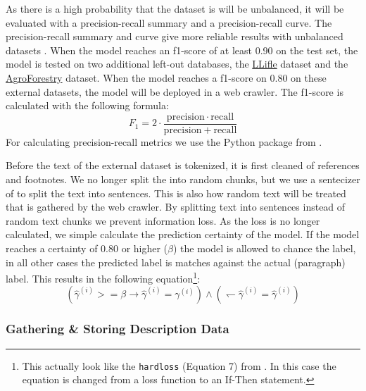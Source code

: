 \documentclass[a4paper, 12pt, oneside]{book} %
\begin{document}
As there is a high probability that the dataset is will be unbalanced, it will be evaluated with a precision-recall summary and a precision-recall curve.
The precision-recall summary and curve give more reliable results with unbalanced datasets \autocite{saito_precision-recall_2015}.
When the model reaches an f1-score of at least 0.90 on the test set, the model is tested on two additional left-out databases, the \href{http://www.llifle.com/}{LLifle} dataset and the \href{https://www.worldagroforestry.org/}{AgroForestry} dataset.
When the model reaches a f1-score on 0.80 on these external datasets, the model will be deployed in a web crawler.
The f1-score is calculated with the following formula:
\begin{equation}
    F_1 = 2 \cdot \frac{\mathrm{precision} \cdot \mathrm{recall}}{\mathrm{precision} + \mathrm{recall}} 
\end{equation}
For calculating precision-recall metrics we use the Python package from \textcite{pedregosa_scikit-learn_2011}.

Before the text of the external dataset is tokenized, it is first cleaned of references and footnotes.
We no longer split the into random chunks, but we use a sentecizer of \textcite{honnibal_spacy_2020} to split the text into sentences.
This is also how random text will be treated that is gathered by the web crawler.
By splitting text into sentences instead of random text chunks we prevent information loss.
As the loss is no longer calculated, we simple calculate the prediction certainty of the model.
If the model reaches a certainty of 0.80 or higher (\(\beta\)) the model is allowed to chance the label, in all other cases the predicted label is matches against the actual (paragraph) label.
This results in the following equation\footnote{This actually look like the \texttt{hardloss} (Equation 7) from \textcite{reed_training_2015}. In this case the equation is changed from a loss function to an If-Then statement.}:
\begin{equation} \label{eq:softloss_ifthen}
(\hat{\gamma}^{(i)} >= \beta \rightarrow \hat{\gamma}^{(i)} = \gamma^{(i)}) \wedge ( \leftharpoondown \hat{\gamma}^{(i)} = \hat{\gamma}^{(i)})
\end{equation}


\subsubsection{Gathering \& Storing Description Data}
\end{document}
